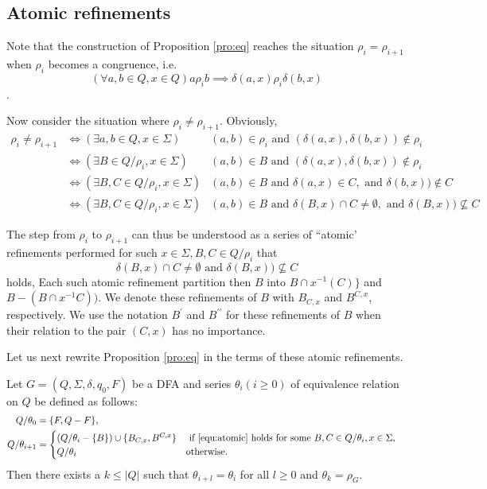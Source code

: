 \subsection{Atomic refinements}

Note that the construction of Proposition \ref{pro:eq}  reaches the situation $\rho_i = \rho_{i+1}$ when $\rho_i$ becomes a congruence, i.e. 
\[(\forall a,b\in Q, x\in Q) a\rho_i b\implies \delta(a,x)\rho_i\delta(b,x) \]. 

Now consider the situation where $\rho_i \ne \rho_{i+1}$. Obviously,
\begin{align*}
\rho_i\ne\rho_{i+1} &\Leftrightarrow (\exists a,b\in Q,x\in\Sigma) &(a,b)\in\rho_i \text{ and } (\delta(a,x),\delta(b,x))\notin\rho_i\\
&\Leftrightarrow (\exists B\in Q/\rho_i,x\in\Sigma) &(a,b)\in B  \text{ and } (\delta(a,x),\delta(b,x))\notin\rho_i\\
&\Leftrightarrow (\exists B,C\in Q/\rho_i,x\in\Sigma) &(a,b)\in B  \text{ and } \delta(a,x)\in C, \text{ and } \delta(b,x))\notin C\\
&\Leftrightarrow (\exists B,C\in Q/\rho_i,x\in\Sigma) &(a,b)\in B  \text{ and } \delta(B,x)\cap C\ne\emptyset, \text{ and } \delta(B,x))\nsubseteq C
\end{align*}

The step from $\rho_i$ to $\rho_{i+1}$ can thus be understood as a series of ``atomic' refinements performed for such $x\in \Sigma, B,C\in Q/\rho_i$ that
\begin{equation}\label{equ:atomic}
	\delta(B,x)\cap C\ne\emptyset \text{ and } \delta(B,x))\nsubseteq C
\end{equation}
holds, Each such atomic refinement partition then $B$ into $B\cap x^{-1}(C) \}$ and $B-(B\cap x^{-1}C))$. We denote these refinements of $B$ with $B_{C,x}$ and $B^{C,x}$, respectively. We use the notation $B^\prime$ and $B^{\prime\prime}$ for these refinements of $B$ when their relation to the pair $(C,x)$ has no importance.

Let us next rewrite Proposition \ref{pro:eq} in the terms of these atomic refinements.

\begin{proposition} \label{pro:eq_relations}
	Let $G=(Q,\Sigma,\delta,q_0,F)$ be a DFA and series $\theta_i (i\ge 0)$ of equivalence relation on $Q$ be defined as follows:
	\begin{align*}
		Q/\theta_0 &=\{F,Q-F \}, &\\
		Q/\theta_{i+1} &=\begin{cases}
		(Q/\theta_i-\{B\})\cup\{B_{C,x},B^{C,x}\} &\text{ if \ref{equ:atomic} holds for some } B,C\in Q/\theta_i, x\in\Sigma,\\
		Q/\theta_i &\text{otherwise}.
		\end{cases}
	\end{align*}
	Then there exists a $k\le |Q|$ such that $\theta_{i+l}=\theta_i$ for all $l\ge 0$ and $\theta_k=\rho_G$.
\end{proposition}

